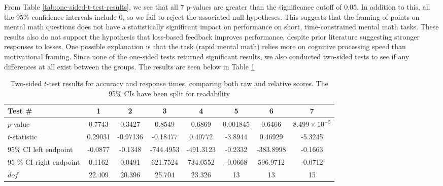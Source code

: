 \documentclass[12pt]{exam}
\begin{document}
From Table \ref{tab:one-sided-t-test-results}, we see that all 7 p-values are greater than the significance cutoff of 0.05. In addition to this, all the 95\% confidence intervals include 0, so we fail to reject the associated null hypotheses. This suggests that the framing of points on mental math questions does not have a statistically significant impact on performance on short, time-constrained mental math tasks. 
These results also do not support the hypothesis that loss-based feedback improves performance, despite prior literature suggesting stronger responses to losses. One possible explanation is that the task (rapid mental math) relies more on cognitive processing speed than motivational framing.  
Since none of the one-sided tests returned significant results, we also conducted two-sided tests to see if any differences at all exist between the groups. The results are seen below in Table \ref{tab:two-sided-t-test-results}

\begin{table}[H]
    \caption{Two-sided $t$-test results for accuracy and response times, comparing both raw and relative scores. The 95\% CIs have been split for readability}
    \centering
    \begin{tabular}{|p{2.4cm}|c|c|c|c|c|c|c|}
    \hline
        Test \# & 1 & 2 & 3 & 4 & 5 & 6 & 7\\ 
    \hline
        $p$-value & 0.7743 & 0.3427 & 0.8549 & 0.6869 & 0.001845 & 0.6466 & $8.499\times10^{-5}$ \\
    \hline
        $t$-statistic & 0.29031 & -0.97136 & -0.18477 & 0.40772 & -3.8944 & 0.46929 & -5.3245 \\
    \hline
        95\% CI left endpoint & -0.0877 & -0.1348 & -744.4953 & -491.3123 & -0.2332 & -383.8998 & -0.1663 \\
    \hline
    95 \% CI right endpoint &  0.1162 & 0.0491 & 621.7524 & 734.0552 &  -0.0668 & 596.9712 & -0.0712 \\
    \hline
        $dof$ & 22.409  & 20.396 & 25.704 & 23.326 & 13 & 13 & 15\\
    \hline
    \end{tabular}
    \label{tab:two-sided-t-test-results}
\end{table}
\end{document}
